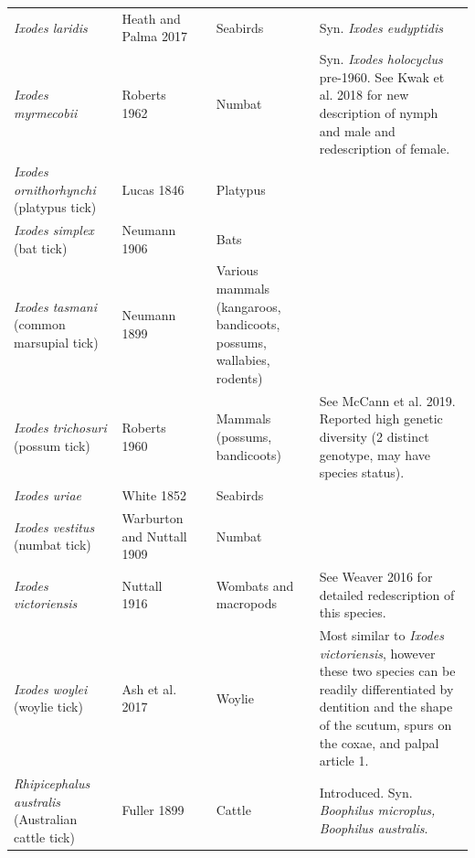 \documentclass[a4paper, nobind]{templates/ociamthesis}
\begin{document}
\begin{landscape}
\begin{longtable}[t]{>{\raggedright\arraybackslash}p{4cm}>{\raggedright\arraybackslash}p{3cm}>{\raggedright\arraybackslash}p{1cm}>{\raggedright\arraybackslash}p{4cm}>{\raggedright\arraybackslash}p{6cm}}
\textit{Ixodes laridis} & Heath and Palma 2017 & \multicolumn{1}{c}{\cellcolor[HTML]{BEBADA}{\textcolor{white}{N}}} & Seabirds & Syn. \textit{Ixodes eudyptidis}\\
\textit{Ixodes myrmecobii} & Roberts 1962 & \multicolumn{1}{c}{\cellcolor[HTML]{8DD3C7}{\textcolor{white}{Y}}} & Numbat & Syn. \textit{Ixodes holocyclus} pre-1960. See Kwak et al. 2018 for new description of nymph and male and redescription of female.\\
\textit{Ixodes ornithorhynchi} (platypus tick) & Lucas 1846 & \multicolumn{1}{c}{\cellcolor[HTML]{8DD3C7}{\textcolor{white}{Y}}} & Platypus & \\
\textit{Ixodes simplex} (bat tick) & Neumann 1906 & \multicolumn{1}{c}{\cellcolor[HTML]{BEBADA}{\textcolor{white}{N}}} & Bats & \\
\textit{Ixodes tasmani} (common marsupial tick) & Neumann 1899 & \multicolumn{1}{c}{\cellcolor[HTML]{8DD3C7}{\textcolor{white}{Y}}} & Various mammals (kangaroos, bandicoots, possums, wallabies, rodents) & \\
\textit{Ixodes trichosuri} (possum tick) & Roberts 1960 & \multicolumn{1}{c}{\cellcolor[HTML]{BEBADA}{\textcolor{white}{N}}} & Mammals (possums, bandicoots) & See McCann et al. 2019. Reported high genetic diversity (2 distinct genotype, may have species status).\\
\textit{Ixodes uriae} & White 1852 & \multicolumn{1}{c}{\cellcolor[HTML]{BEBADA}{\textcolor{white}{N}}} & Seabirds & \\
\textit{Ixodes vestitus} (numbat tick) & Warburton and Nuttall 1909 & \multicolumn{1}{c}{\cellcolor[HTML]{BEBADA}{\textcolor{white}{N}}} & Numbat & \\
\textit{Ixodes victoriensis} & Nuttall 1916 & \multicolumn{1}{c}{\cellcolor[HTML]{BEBADA}{\textcolor{white}{N}}} & Wombats and macropods & See Weaver 2016 for detailed redescription of this species.\\
\textit{Ixodes woylei} (woylie tick) & Ash et al. 2017 & \multicolumn{1}{c}{\cellcolor[HTML]{BEBADA}{\textcolor{white}{N}}} & Woylie & Most similar to \textit{Ixodes victoriensis}, however these two species can be readily differentiated by dentition and the shape of the scutum, spurs on the coxae, and palpal article 1.\\
\textit{Rhipicephalus australis} (Australian cattle tick) & Fuller 1899 & \multicolumn{1}{c}{\cellcolor[HTML]{8DD3C7}{\textcolor{white}{Y}}} & Cattle & Introduced. Syn. \textit{Boophilus microplus, Boophilus australis}.\\

\end{longtable}
\end{landscape}
\end{document}
